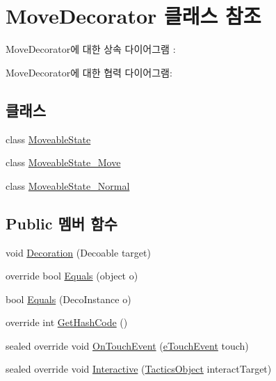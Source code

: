 \hypertarget{class_move_decorator}{}\section{Move\+Decorator 클래스 참조}
\label{class_move_decorator}


Move\+Decorator에 대한 상속 다이어그램 \+: 


Move\+Decorator에 대한 협력 다이어그램\+:
\subsection*{클래스}
\begin{DoxyCompactItemize}
\item 
class \hyperlink{class_move_decorator_1_1_moveable_state}{Moveable\+State}
\item 
class \hyperlink{class_move_decorator_1_1_moveable_state___move}{Moveable\+State\+\_\+\+Move}
\item 
class \hyperlink{class_move_decorator_1_1_moveable_state___normal}{Moveable\+State\+\_\+\+Normal}
\end{DoxyCompactItemize}
\subsection*{Public 멤버 함수}
\begin{DoxyCompactItemize}
\item 
void \hyperlink{class_m_c_n_1_1_decorator_ab82c83f62182a25a72dc81530c743c32}{Decoration} (Decoable target)
\item 
override bool \hyperlink{class_m_c_n_1_1_decorator_ae2a5432ce00298c80dcb433a75bbe45d}{Equals} (object o)
\item 
bool \hyperlink{class_m_c_n_1_1_decorator_a3ad7a8cf76c976907116f85a65a9f8e9}{Equals} (Deco\+Instance o)
\item 
override int \hyperlink{class_m_c_n_1_1_decorator_a6df84cd2af5b096128e84791455c083f}{Get\+Hash\+Code} ()
\item 
sealed override void \hyperlink{class_m_c_n_1_1_decorator_ab99273d32a380d567f03737ea57ec083}{On\+Touch\+Event} (\hyperlink{_touch_manager_8cs_ae33e321a424fe84ba8b2fdb81ad40a68}{e\+Touch\+Event} touch)
\item 
sealed override void \hyperlink{class_m_c_n_1_1_decorator_ae58cb79cf1ee47006b7dbdac82b97dc5}{Interactive} (\hyperlink{class_tactics_object}{Tactics\+Object} interact\+Target)
\end{DoxyCompactItemize}
